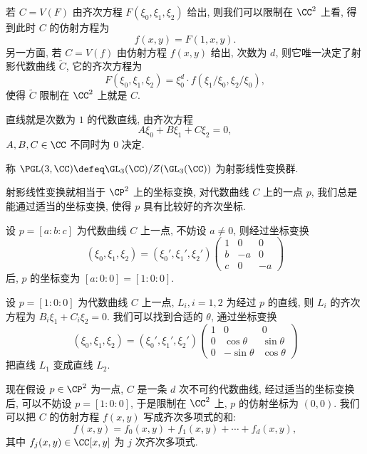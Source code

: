 若 $C = V(F)$ 由齐次方程 $F(\xi_0,\xi_1,\xi_2)$ 给出,
则我们可以限制在 $\CC^2$ 上看, 得到此时 $C$ 的仿射方程为
\[f(x,y) = F(1,x,y).\]
另一方面, 若 $C = V(f)$ 由仿射方程 $f(x,y)$ 给出, 次数为 $d$,
则它唯一决定了射影代数曲线 $\tilde{C}$,
它的齐次方程为
\[F(\xi_0,\xi_1,\xi_2) = \xi_0^d\cdot f(\xi_1/\xi_0, \xi_2/\xi_0),\]
使得 $\tilde{C}$ 限制在 $\CC^2$ 上就是 $C$.

\begin{exmp}[直线]
\label{exmp:line}
直线就是次数为 $1$ 的代数直线,
由齐次方程
\[A\xi_0 + B\xi_1 + C\xi_2 = 0,\]
$A,B,C \in \CC$ 不同时为 $0$ 决定.
\end{exmp}

\begin{defin}[射影线性变换]
\label{defin:PGL}
称 $\PGL(3, \CC) \defeq \GL_3(\CC)/Z(\GL_3(\CC))$ 为射影线性变换群.
\end{defin}

射影线性变换就相当于 $\CP^2$ 上的坐标变换,
对代数曲线 $C$ 上的一点 $p$,
我们总是能通过适当的坐标变换,
使得 $p$ 具有比较好的齐次坐标.

\begin{exmp}[平移]
\label{exmp:translation}
设 $p = [a:b:c]$ 为代数曲线 $C$ 上一点, 不妨设 $a \ne 0$,
则经过坐标变换
\begin{equation}
\label{eq:translation}
(\xi_0,\xi_1,\xi_2) = (\xi_0',\xi_1',\xi_2')
\begin{pmatrix} 1 &0 &0\\ b &-a &0\\ c &0 &-a \end{pmatrix}
\end{equation}
后, $p$ 的坐标变为 $[a:0:0] = [1:0:0]$.
\end{exmp}

\begin{exmp}[旋转]
\label{exmp:rotation}
设 $p = [1:0:0]$ 为代数曲线 $C$ 上一点,
$L_i, i = 1,2$ 为经过 $p$ 的直线,
则 $L_i$ 的齐次方程为 $B_i\xi_1 + C_i\xi_2 = 0$.
我们可以找到合适的 $\theta$, 通过坐标变换
\begin{equation}
\label{eq:rotation}
(\xi_0,\xi_1,\xi_2) = (\xi_0',\xi_1',\xi_2')
\begin{pmatrix} 1 &0 &0\\ 0 &\cos\theta &\sin\theta\\ 0 &-\sin\theta &\cos\theta\end{pmatrix}
\end{equation}
把直线 $L_1$ 变成直线 $L_2$.
\end{exmp}

现在假设 $p \in \CP^2$ 为一点, $C$ 是一条 $d$ 次不可约代数曲线,
经过适当的坐标变换后, 可以不妨设 $p = [1:0:0]$,
于是限制在 $\CC^2$ 上, $p$ 的仿射坐标为 $(0,0)$.
我们可以把 $C$ 的仿射方程 $f(x,y)$ 写成齐次多项式的和:
\begin{equation}
\label{eq:homo-sum-of-a-polynomial}
f(x,y) = f_0(x,y) + f_1(x,y) + \cdots + f_d(x,y),
\end{equation}
其中 $f_j(x,y) \in \CC[x,y]$ 为 $j$ 次齐次多项式.

